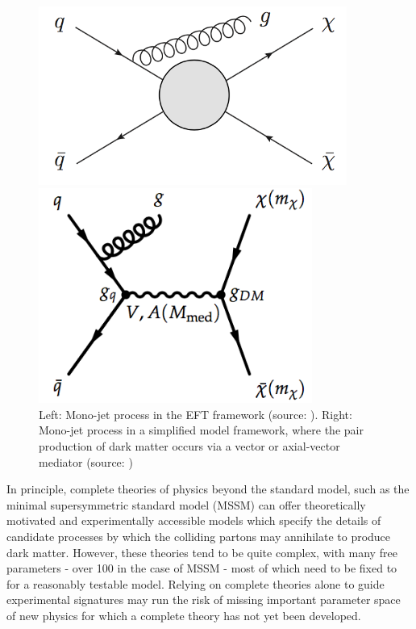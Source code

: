 \documentclass[12pt]{article}
\begin{document}
\begin{figure}[H]
	\centering
	\begin{minipage}[b]{0.45\textwidth}
	\includegraphics[width=0.9\textwidth]{figures/EFT_Signature.png}
	\end{minipage}
	\begin{minipage}[b]{0.45\textwidth}
	\includegraphics[width=0.8\textwidth]{figures/simplified_model.png}
	\end{minipage}
	\caption{Left: Mono-jet process in the EFT framework (source: \cite{beyond_eft}). Right: Mono-jet process in a simplified model framework, where the pair production of dark matter occurs via a vector or axial-vector mediator (source: \cite{dm_forum})}
	\label{fig:eft_simplified_model}
\end{figure}

In principle, complete theories of physics beyond the standard model, such as the minimal supersymmetric standard model (MSSM) \cite{mssm} can offer theoretically motivated and experimentally accessible models which specify the details of candidate processes by which the colliding partons may annihilate to produce dark matter. However, these theories tend to be quite complex, with many free parameters - over 100 in the case of MSSM \cite{DM_colliders} - most of which need to be fixed to for a reasonably testable model. Relying on complete theories alone to guide experimental signatures may run the risk of missing important parameter space of new physics for which a complete theory has not yet been developed. 
\end{document}
